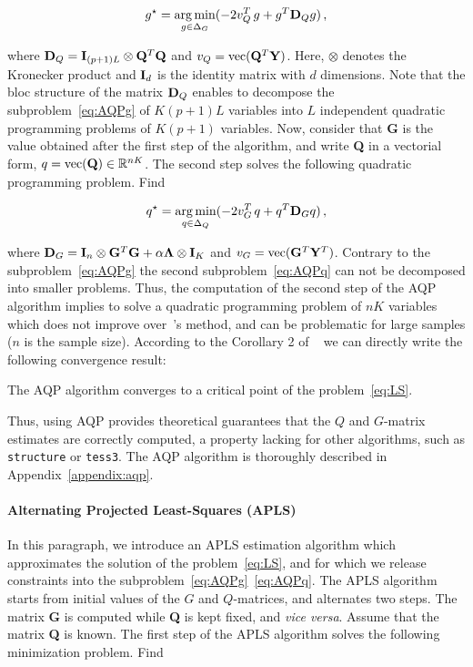 \begin{equation}
\begin{aligned}
g^\star = \underset{g \in \Delta_G}{\arg \min}  ( -2  v^T_Q \, g + g^T {\bf D}_Q g ) \, ,  
\end{aligned}
\label{eq:AQPg}
\end{equation}

\noindent where ${\bf D}_Q = {\bf I}_{(p+1)L} \otimes {\bf Q}^T {\bf Q}$ and $v_Q = {\rm vec}({\bf Q}^T {\bf Y})$. Here, $\otimes$ denotes the Kronecker product and ${\bf I}_d$ is the identity matrix with $d$ dimensions. Note that the bloc structure of the matrix ${\bf D}_Q$ enables to decompose the subproblem~\ref{eq:AQPg} of $K(p + 1)L$ variables into $L$ independent quadratic programming problems of $K(p + 1)$ variables. Now, consider that {\bf G} is the value obtained after the first step of the algorithm, and write {\bf Q} in a vectorial form, $q = {\rm vec({\bf Q})} \in \mathbb{R}^{nK}$. The second step solves the following quadratic programming problem. Find

\begin{equation}
\begin{aligned}
q^\star = \underset{q \in \Delta_Q}{\arg \min} ( -2 v^T_G \, q + q^T {\bf D}_G q ) \,  ,
\end{aligned}
\label{eq:AQPq}
\end{equation}

\noindent where ${\bf D}_G = {\bf I}_{n} \otimes {\bf G}^T {\bf G } + \alpha {\bf \Lambda}  \otimes {\bf I}_K$ and $v_G = {\rm vec}({\bf G}^T{\bf  Y}^T)$. Contrary to the subproblem~\ref{eq:AQPg} the second subproblem~\ref{eq:AQPq} can not be decomposed into smaller problems. Thus, the computation of the second step of the AQP algorithm implies to solve a quadratic programming problem of $nK$ variables which does not improve over~\cite{Caye2016}'s method, and can be problematic for large samples ($n$ is the sample size). According to the Corollary 2 of ~\cite{Grippo2000} we can directly write the following convergence result:
\begin{thm}
	The AQP algorithm converges to a critical point of the problem~\ref{eq:LS}.
\end{thm}
Thus, using AQP provides theoretical guarantees that the $Q$ and $G$-matrix estimates are correctly computed, a property lacking for other algorithms, such as {\tt structure} or {\tt tess3}. The AQP algorithm is thoroughly described in Appendix~\ref{appendix:aqp}.

\paragraph{Alternating Projected Least-Squares (APLS)} In this paragraph, we introduce an APLS estimation algorithm which approximates the solution of the problem~\ref{eq:LS}, and for which we release constraints into the subproblem~\ref{eq:AQPg}~\ref{eq:AQPq}. The APLS algorithm starts from initial values of the $G$ and $Q$-matrices, and alternates two steps. The matrix {\bf G} is computed  while  {\bf Q} is kept fixed, and {\it vice versa}. Assume that the matrix {\bf Q} is known. The first step of the APLS algorithm solves the following minimization problem. Find 

